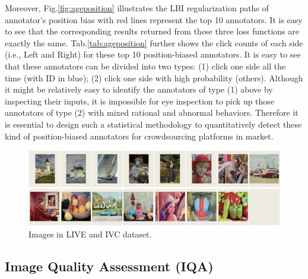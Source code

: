 \documentclass[10pt,journal,cspaper,compsoc]{IEEEtran}
\begin{document}
{Moreover, Fig.\ref{fig:ageposition} illustrates the LBI regularization paths of annotator's position bias with red lines represent the top 10 annotators. It is easy to see that the corresponding results returned from these three loss functions are exactly the same. Tab.\ref{tab:ageposition} further shows the click counts of each side (i.e., Left and Right) for these top 10 position-biased annotators.
It is easy to see that these annotators can be divided
into two types: (1) click one side all the time (with
ID in blue); (2) click one side with high probability
(others). Although it
might be relatively easy to identify the annotators of type (1) above
by inspecting their inputs, it is impossible for eye inspection
to pick up those annotators of type (2) with mixed rational and abnormal behaviors.
Therefore it is essential to design such a statistical methodology to
quantitatively detect these kind of position-biased annotators
for crowdsourcing platforms in market.



\begin{figure}[h]
 \begin{center}
\includegraphics[width=0.8\linewidth]{iqa.png}
  \caption{Images in LIVE and IVC dataset.} \label{iqadataset}
\end{center}
\end{figure}



\subsection{Image Quality Assessment (IQA)}

}
\end{document}
